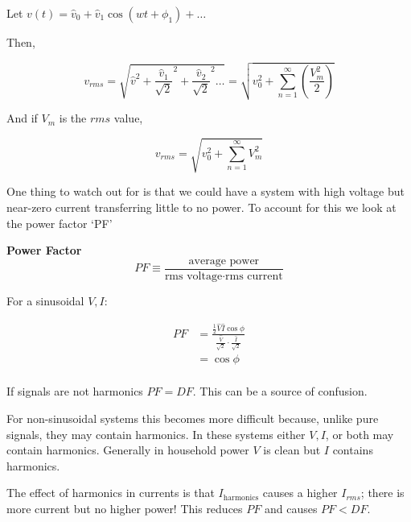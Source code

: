 \documentclass[../notes.tex]{subfiles}
\begin{document}
\begin{definition}
	Let $ v(t) = \hat{v}_0 + \hat{v}_1 \cos(wt+\phi_1) + \ldots $ 

	Then,


	\begin{equation}
		v_{rms} = \sqrt{\hat{v}^2 + \frac{\hat{v}_1}{\sqrt{2} }^2 + \frac{\hat{v}_2}{\sqrt{2} }^2 \ldots }   = \sqrt{v_0^2 + \sum^\infty_{n=1} (\frac{V_m^2}{2})} 
	\end{equation}

	And if $ V_m $ is the $ rms $ value,

	\begin{equation}
		v_{rms} = \sqrt{v_0^2 + \sum^\infty_{n=1} V_m^2} 
	\end{equation}
	

\end{definition}

One thing to watch out for is that we could have a system with high voltage but near-zero current transferring little to no power. 
To account for this we look at the power factor `PF'

\begin{definition}
	\textbf{Power Factor} 
	\begin{equation}
		PF \equiv \frac{\text{average power}}{\text{rms voltage} \cdot  \text{rms current}}
	\end{equation}
\end{definition}

For a sinusoidal $ V, I $:


\begin{equation}
	\begin{split}
		PF &= \frac{\frac{1}{2} \hat{V} \hat{I} \cos \phi}{  \frac{\hat{V}}{\sqrt{2} } \cdot  \frac{\hat{I}}{\sqrt{2} }  }  \\
		 &=  \cos\phi\\
	\end{split}
\end{equation}


If signals are not harmonics $ PF = DF $. This can be a source of confusion. 


For non-sinusoidal systems this becomes more difficult because, unlike pure signals, they may contain harmonics.
In these systems either $ V, I $, or both may contain harmonics. 
Generally in household power $ V $ is clean but $ I $ contains harmonics.


The effect of harmonics in currents is that $ I_{\text{harmonics}} $ causes a higher $ I_{rms} $; there is more current but no higher power!
This reduces $ PF $ and causes $ PF < DF $.
\end{document}
